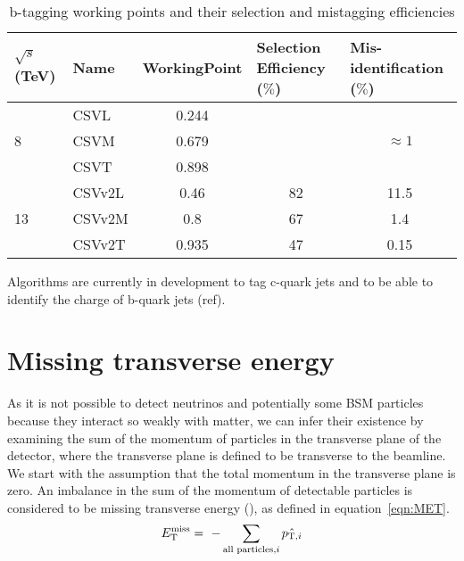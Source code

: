 \begin{table}[htpb!]
\footnotesize
\begin{center}
\begin{tabular}{l|l|c|c|c}
$\sqrt{s}$ (TeV)    & Name   & \multicolumn{1}{l|}{WorkingPoint} & \multicolumn{1}{l|}{Selection Efficiency ($\%$)} & \multicolumn{1}{l}{Mis-identification ($\%$)} \\ \hline
\multirow{3}{*}{8}  & CSVL   & 0.244                             &                                                  &                                               \\ \cline{2-5} 
                    & CSVM   & 0.679                             &                                                  & $\approx 1$                                   \\ \cline{2-5} 
                    & CSVT   & 0.898                             &                                                  &                                               \\ \hline
\multirow{3}{*}{13} & CSVv2L & 0.46                              & 82                                               & 11.5                                          \\ \cline{2-5} 
                    & CSVv2M & 0.8                               & 67                                               & 1.4                                           \\ \cline{2-5} 
                    & CSVv2T & 0.935                             & 47                                               & 0.15                                         
\end{tabular}
\caption{b-tagging working points and their selection and mistagging efficiencies}
\label{tab:btag}
\end{center}
\end{table}

Algorithms are currently in development to tag c-quark jets and to be able to identify the charge of b-quark jets (ref).

\section{Missing transverse energy ~\label{sec:METreco}}
As it is not possible to detect neutrinos and potentially some BSM particles because they interact so weakly with matter, we can infer their existence by examining the sum of the momentum of particles in the transverse plane of the detector, where the transverse plane is defined to be transverse to the beamline. We start with the assumption that the total momentum in the transverse plane is zero. An imbalance in the sum of the momentum of detectable particles is considered to be missing transverse energy (\ETmiss), as defined in equation~\ref{eqn:MET}.
\begin{equation}
E_{\mathrm{T}}^{\text{miss}} = ~- \sum_{\textrm{all particles,}i} \hat{ {p}_{\textrm{T},i} }
\label{eqn:MET}
\end{equation}



